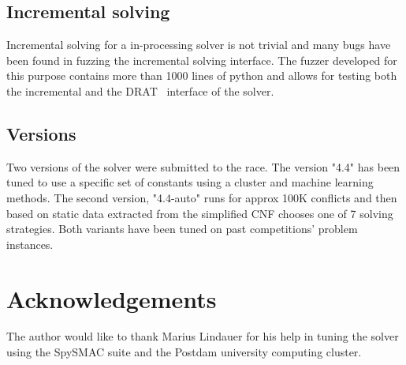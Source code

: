 \documentclass[final]{ieee}
\begin{document}
\subsection{Incremental solving}
Incremental solving for a in-processing solver is not trivial and many bugs have been found in fuzzing the incremental solving interface. The fuzzer developed for this purpose contains more than 1000 lines of python and allows for testing both the incremental and the DRAT~\cite{drat} interface of the solver.

\subsection{Versions}
Two versions of the solver were submitted to the race. The version "4.4" has been tuned to use a specific set of constants using a cluster and machine learning methods. The second version, "4.4-auto" runs for approx 100K conflicts and then based on static data extracted from the simplified CNF chooses one of 7 solving strategies. Both variants have been tuned on past competitions' problem instances.

\section*{Acknowledgements}
The author would like to thank Marius Lindauer for his help in tuning the solver using the SpySMAC suite and the Postdam university computing cluster.




\vfill
\pagebreak
\end{document}
